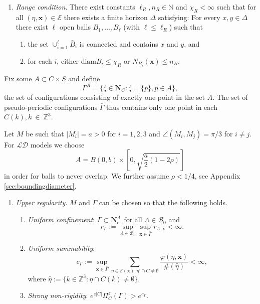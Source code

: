 \documentclass{kybernetika}
\newcommand{\x}{{\mathbf{x}}}
\begin{document}
\begin{enumerate}[\textbf{(R)}]\label{(R)}
	\item \textit{Range condition}. There exist constants $\ell_R,n_R \in \mathbb N$ and $\chi_R < \infty$ such that for all $(\eta,\x) \in \mathcal E$ there exists a finite horizon $\Delta$ satisfying: For every $x,y \in \Delta$ there exist $\ell$ open balls $B_1, \dots, B_\ell$ (with $\ell \leq \ell_R$) such that
	\begin{enumerate}[-]
		\item the set $\cup^\ell_{i=1} \bar B_i$ is connected and contains $x$ and $y$, and 
		\item for each $i$, either $\text{diam} B_i \leq \chi_R$ or $N_{B_i}(\x) \leq n_R$.
	\end{enumerate}
\end{enumerate}

\noindent Fix some $A \subset C\times S$ and define
$$\Gamma^A = \{\zeta \in \mathbf N_C: \zeta = \{p\}, p \in A\},$$
the set of configurations consisting of exactly one point in the set $A$. The set of pseudo-periodic configurations $\bar\Gamma$ thus contains only one point in each $C(k), k~\in~\mathbb Z^3$.

Let $M$ be such that $|M_i| = a > 0$ for $i=1,2,3$ and $\angle(M_i,M_j) = \pi / 3$ for $i\neq j$.
For $\mathcal {LD}$ models we choose 
\begin{equation}\label{eq:choiceA} A = B(0,b)\times \left[0, \sqrt{\frac a2(1-2\rho)}\right] \end{equation}
in order for balls to never overlap. We further assume $\rho < 1/4$, see Appendix \ref{sec:boundingdiameter}.


\begin{enumerate}[\textbf{(U)}] 
	\item \textit{Upper regularity}. $M$ and $\Gamma$ can be chosen so that the following holds. 
		\begin{enumerate}[(U1)]
			\item \textit{Uniform confinement}: $\bar \Gamma \subset \mathbf N^\Lambda_\text{cr}$ for all $\Lambda \in \mathcal B_0$ and 
				\begin{equation}\label{eq:U1}r_\Gamma := \sup_{\Lambda\in\mathcal B_0}\sup_{\x \in \bar\Gamma} r_{\Lambda, \x} < \infty. \end{equation}
			\item \textit{Uniform summability}: 
			$$c_\Gamma := \sup_{\x \in \bar\Gamma}  \sum_{\eta \in \mathcal E(\x): \eta' \cap C \neq \emptyset} \frac{\varphi(\eta,\x)}{\#(\hat\eta)} < \infty,$$
where $\hat\eta := \{k \in \mathbb Z^3: \eta \cap C(k) \neq \emptyset\}$.
\item \textit{Strong non-rigidity}: $e^{z|C|} \Pi^z_C(\Gamma) > e^{c_\Gamma}$.
		\end{enumerate}
\end{enumerate}
\end{document}
